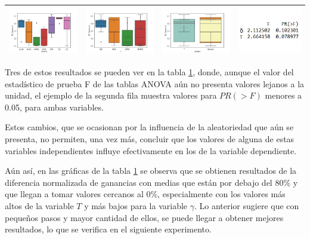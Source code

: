 \begin{table}[H]
\begin{tabular}[c]{llll}
\multicolumn{1}{|l|}{\includegraphics[align=t, width=33mm]{cajasGamma_exp33.jpg}}    & \multicolumn{1}{l|}{\includegraphics[align=t, width=33mm]{cajasT_exp33.jpg} } & \multicolumn{1}{l|}{\includegraphics[align=t, width=33mm]{cajasT_Gamma_exp33.jpg} } & \multicolumn{1}{p{3cm}|}{\includegraphics[align=t, width=30mm]{Anova33.png}} \\ \hline
\end{tabular}
\label{exp3}
\end{table}

Tres de estos resultados se pueden ver en la tabla \ref{exp3}, donde, aunque el valor del estadístico de prueba F de las tablas ANOVA aún no presenta valores lejanos a la unidad, el ejemplo de la segunda fila muestra valores para $PR(>F)$ menores a 0.05, para ambas variables. 
 
Estos cambios, que se ocasionan por la influencia de la aleatoriedad que aún se presenta, no permiten, una vez más, concluir que los valores de alguna de estas variables independientes influye efectivamente en los de la variable dependiente. 
 
Aún así, en las gráficas de la tabla \ref{exp3} se observa que se obtienen resultados de la diferencia normalizada de ganancias con medias que están por debajo del 80\% y que llegan a tomar valores cercanos al 0\%, especialmente con los valores más altos de la variable $T$ y más bajos para la variable $\gamma$. Lo anterior sugiere que con pequeños pasos y mayor cantidad de ellos, se puede llegar a obtener mejores resultados, lo que se verifica en el siguiente experimento.

